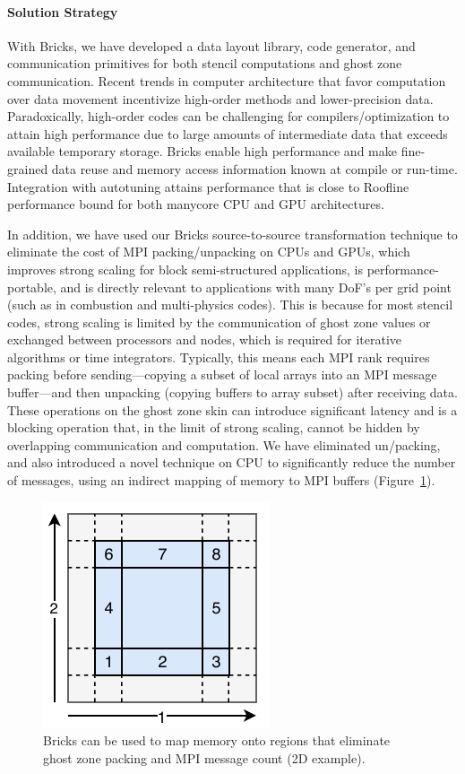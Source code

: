 \paragraph{Solution Strategy}
With Bricks, we have developed a data layout library, code 
  generator, and communication primitives for both stencil computations and ghost zone communication.
Recent trends in computer architecture that favor computation over data 
  movement incentivize high-order methods and lower-precision data.
Paradoxically, high-order codes can be challenging for compilers/optimization 
  to attain high performance due to large amounts of intermediate data that exceeds available temporary storage.
Bricks enable high performance and make fine-grained data reuse and 
  memory access information known at compile or run-time.
Integration with autotuning attains performance that is close to Roofline
  performance bound for both manycore CPU and GPU architectures.


In addition, we have used our Bricks source-to-source transformation technique to 
  eliminate the cost of MPI packing/unpacking on CPUs and GPUs, which 
  improves strong scaling for block semi-structured applications, is 
  performance-portable, and is directly relevant to applications with many 
  DoF’s per grid point (such as in combustion and multi-physics codes). 
This is because for most stencil codes, strong scaling is
  limited by the communication of ghost zone values or exchanged between
  processors and nodes, which is required for iterative algorithms or time
  integrators. 
Typically, this means each MPI rank requires packing before sending---copying a 
  subset of local arrays into an MPI message buffer---and then unpacking 
  (copying buffers to array subset) after receiving data. 
These operations on the ghost zone skin can introduce significant latency 
  and is a blocking operation that, in the limit of strong scaling, 
  cannot be hidden by overlapping communication and computation. 
We have eliminated un/packing, and also introduced a novel technique on CPU to
  significantly reduce the number of messages, using an indirect mapping 
  of memory to MPI buffers (Figure~\ref{figure:bricksmap}).

  
  \begin{figure}
\begin{center}
  \includegraphics[trim=3mm 5mm 3mm 8mm,width=.33\textwidth]{projects/2.3.2-Tools/2.3.2.10-PROTEAS-YTUNE/Bricks-mpi-parts.pdf}
\end{center}
  \caption{Bricks can be used to map memory onto regions that
  eliminate ghost zone packing and MPI message count (2D example).}
  \label{figure:bricksmap}
\end{figure}

